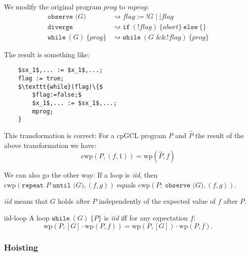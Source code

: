 \documentclass[english]{panikzettel}
\newcommand{\stmtDiverge}{\texttt{diverge}}
\newcommand{\stmtObserve}[1]{\texttt{observe (}#1\texttt{)}}
\newcommand{\stmtSeq}[2]{#1;~ #2}
\newcommand{\stmtIf}[3]{\texttt{if}~(#1)~\{ #2 \}~\texttt{else}~\{ #3 \}}
\newcommand{\stmtWhile}[2]{\texttt{while}~(#1)~\{ #2 \}}
\renewcommand{\wp}{\mathrm{wp}}
\newcommand{\cwp}{\mathrm{cwp}}
\begin{document}
\begin{minipage}[t]{0.55\textwidth}
    We modify the original program $prog$ to $mprog$:
    \begin{align*}
        \stmtObserve{G} &\rightsquigarrow flag:=!G \mid \mid flag \\
        \stmtDiverge &\rightsquigarrow \stmtIf{!flag}{abort}{} \\
        \stmtWhile{G}{prog} &\rightsquigarrow \stmtWhile{G \text{ \&\& } !flag}{prog}
    \end{align*}
\end{minipage}\hfill%
\begin{minipage}[t]{0.4\textwidth}
    \small{}
    The result is something like:
    \begin{lstlisting}
    $sx_1$,... := $x_1$,...;
    flag := true;
    $\texttt{while}(flag)\{$
        $flag:=false;$
        $x_1$,... := $sx_1$,...;
        mprog;
    }
    \end{lstlisting}
\end{minipage}

This transformation is correct: For a cpGCL program $P$ and $\hat{P}$ the result of the above transformation we have:
\[
    \cwp(P,(f,1))=\wp(\hat{P},f)
\]

\begin{halfboxl}
    We can also go the other way: If a loop is \emph{iid}, then
    $\cwp(\texttt{repeat } P \texttt{ until (}G\texttt{)}, (f,g))$
    equals
    $\cwp(\stmtSeq{P}{\stmtObserve{G}},(f,g))$.

    \emph{iid} means that $G$ holds after $P$ independently of the expected value of $f$ after $P$.
\end{halfboxl}%
\begin{halfboxr}
    \vspace{-\baselineskip}
    \begin{defi}{iid-loop}
        A loop $\stmtWhile{G}{P}$ is \emph{iid} iff for any expectation $f$:
        \small{}
        \[
            \wp(P, [G] \cdot \wp(P,f)) = \wp(P, [G]) \cdot \wp(P, f).
        \]
    \end{defi}
\end{halfboxr}

\vspace{-\baselineskip}

\subsubsection{Hoisting}
\end{document}

